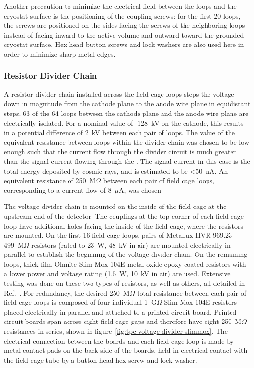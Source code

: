 Another precaution to minimize the electrical field between the loops and the cryostat surface is the positioning of the coupling screws: for the first 20 loops, the screws are positioned on the sides facing the screws of the neighboring loops instead of facing inward to the \lartpc active volume and outward toward the grounded cryostat surface. Hex head button screws and lock washers are also used here in order to minimize sharp metal edges.


\subsubsection{Resistor Divider Chain}

A resistor divider chain installed across the field cage loops steps the voltage down in magnitude from the cathode plane to the anode wire plane in equidistant steps. 63 of the 64 loops between the cathode plane and the anode wire plane are electrically isolated.  For a nominal value of -128~kV on the cathode, this results in a potential difference of 2~kV between each pair of loops. The value of the equivalent resistance between loops within the divider chain was chosen to be low enough such that the current flow through the divider circuit is much greater than the signal current flowing through the \lartpc. The signal current in this case is the total energy deposited by cosmic rays, and is estimated to be <50~nA. An equivalent resistance of 250~M$\Omega$ between each pair of field cage loops, corresponding to a current flow of 8~$\mu$A, was chosen.  

The voltage divider chain is mounted on the inside of the field cage at the upstream end of the detector. The couplings at the top corner of each field cage loop have additional holes facing the inside of the field cage, where the resistors are mounted. On the first 16 field cage loops, pairs of Metallux HVR 969.23 499~M$\Omega$ resistors (rated to 23~W, 48~kV in air) are mounted electrically in parallel to establish the beginning of the voltage divider chain. On the remaining loops, thick-film Ohmite Slim-Mox 104E metal-oxide epoxy-coated resistors with a lower power and voltage rating (1.5~W, 10~kV in air) are used. Extensive testing was done on these two types of resistors, as well as others, all detailed in Ref.~\cite{Bagby:2014-resistortests}. For redundancy, the desired 250~M$\Omega$ total resistance between each pair of field cage loops is composed of four individual 1~G$\Omega$ Slim-Mox 104E resistors placed electrically in parallel and attached to a printed circuit board. Printed circuit boards span across eight field cage gaps and therefore have eight 250~M$\Omega$ resistances in series, shown in figure~\ref{fig:tpc-voltage-divider-slimmox}. The electrical connection between the boards and each field cage loop is made by metal contact pads on the back side of the boards, held in electrical contact with the field cage tube by a button-head hex screw and lock washer.

